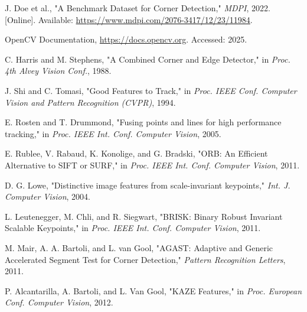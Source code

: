 \documentclass[journal]{IEEEtran}
\begin{document}
\begin{thebibliography}{1}

    J. Doe et al., "A Benchmark Dataset for Corner Detection," \textit{MDPI}, 2022. [Online]. Available: \url{https://www.mdpi.com/2076-3417/12/23/11984}.

    OpenCV Documentation, \url{https://docs.opencv.org}. Accessed: 2025.

    C. Harris and M. Stephens, "A Combined Corner and Edge Detector," in \textit{Proc. 4th Alvey Vision Conf.}, 1988.

    J. Shi and C. Tomasi, "Good Features to Track," in \textit{Proc. IEEE Conf. Computer Vision and Pattern Recognition (CVPR)}, 1994.

    E. Rosten and T. Drummond, "Fusing points and lines for high performance tracking," in \textit{Proc. IEEE Int. Conf. Computer Vision}, 2005.

    E. Rublee, V. Rabaud, K. Konolige, and G. Bradski, "ORB: An Efficient Alternative to SIFT or SURF," in \textit{Proc. IEEE Int. Conf. Computer Vision}, 2011.

    D. G. Lowe, "Distinctive image features from scale-invariant keypoints," \textit{Int. J. Computer Vision}, 2004.

    L. Leutenegger, M. Chli, and R. Siegwart, "BRISK: Binary Robust Invariant Scalable Keypoints," in \textit{Proc. IEEE Int. Conf. Computer Vision}, 2011.

    M. Mair, A. A. Bartoli, and L. van Gool, "AGAST: Adaptive and Generic Accelerated Segment Test for Corner Detection," \textit{Pattern Recognition Letters}, 2011.

    P. Alcantarilla, A. Bartoli, and L. Van Gool, "KAZE Features," in \textit{Proc. European Conf. Computer Vision}, 2012.

\end{thebibliography}

\onecolumn
\appendix
\end{document}
